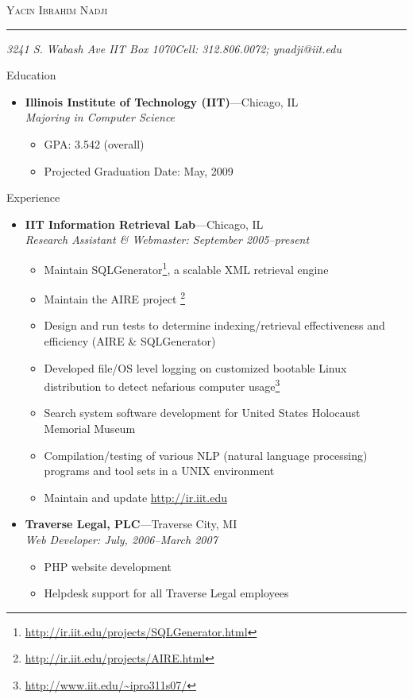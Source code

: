 \documentclass[11pt,oneside]{article}
\makeatletter
\newcommand{\name}{Yacin Ibrahim Nadji}
\newcommand{\addr}{3241 S. Wabash Ave IIT Box 1070}
\newcommand{\phone}{Cell: 312.806.0072}
\newcommand{\email}{ynadji@iit.edu}
\newcommand{\bigname}[1]{
	\begin{center}\fontfamily{phv}\selectfont\Huge\scshape#1\end{center}
}
\newenvironment{ressection}[1]{
	\vspace{4pt}
	{\fontfamily{phv}\selectfont\Large#1}
	\begin{itemize}
	\vspace{3pt}
}{
	\end{itemize}
}
\newcommand{\ressubitem}[1]{
	\vspace{-1pt}
	\item \begin{flushleft} #1 \end{flushleft}
}
\newcommand{\resbigitem}[3]{
	\vspace{-5pt}
	\item
	\textbf{#1}---#2 \\
	\textit{#3}
}
\newenvironment{ressubsec}[3]{
	\resbigitem{#1}{#2}{#3}
	\vspace{-2pt}
	\begin{itemize}
}{
	\end{itemize}
}
\makeatother
\begin{document}
 \selectfont

\bigname{\name}

\vspace{-8pt} \rule{\textwidth}{1pt}

\vspace{-1pt} {\small\itshape \addr \hfill \phone; \email}

\vspace{8 pt}




\begin{ressection}{Education}

	\begin{ressubsec}{Illinois Institute of Technology (IIT)}{Chicago, IL}{Majoring in Computer Science}
		\ressubitem{GPA: 3.542 (overall)}
		\ressubitem{Projected Graduation Date: May, 2009}
	\end{ressubsec}

\end{ressection}


\begin{ressection}{Experience}

	\begin{ressubsec}{IIT Information Retrieval Lab}{Chicago, IL}{Research Assistant \& Webmaster: September 2005--present}
		\ressubitem{Maintain SQLGenerator\footnote{\color{blue} \url{http://ir.iit.edu/projects/SQLGenerator.html}}, a scalable XML retrieval engine}
		\ressubitem{Maintain the AIRE project \footnote{\color{blue} \url{http://ir.iit.edu/projects/AIRE.html}}}
		\ressubitem{Design and run tests to determine indexing/retrieval effectiveness and efficiency (AIRE \& SQLGenerator)}
			\ressubitem{Developed file/OS level logging on customized bootable Linux distribution to detect nefarious computer usage\footnote{\color{blue}\url{http://www.iit.edu/~ipro311s07/}}}
		\ressubitem{Search system software development for United States Holocaust Memorial Museum}
		\ressubitem{Compilation/testing of various NLP (natural language processing) programs and tool sets in a UNIX environment}
		\ressubitem{Maintain and update \color{blue} \url{http://ir.iit.edu}\color{black}}
	\end{ressubsec}

	\begin{ressubsec}{Traverse Legal, PLC}{Traverse City, MI}{Web Developer: July, 2006--March 2007}
		\ressubitem{PHP website development}
		\ressubitem{Helpdesk support for all Traverse Legal employees}
	\end{ressubsec}

\end{ressection}
\end{document}
